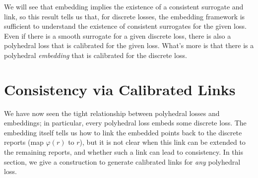 \documentclass[11pt]{article}
\newcommand{\Comments}{1}
\newcommand{\mynote}[2]{\ifnum\Comments=1\textcolor{#1}{#2}\fi}
\newcommand{\mytodo}[2]{\ifnum\Comments=1%
  \todo[linecolor=#1!80!black,backgroundcolor=#1,bordercolor=#1!80!black]{#2}\fi}
\newcommand{\raf}[1]{\mynote{darkgreen}{[RF: #1]}}
\newcommand{\jessiet}[1]{\mytodo{teal!20!white}{JF: #1}}
\newcommand{\btw}[1]{\mytodo{gray!20!white}{BTW: #1}}%
\newtheorem{corollary}{Corollary}
\begin{document}
We will see that embedding implies the existence of a consistent surrogate and link, so this result tells us that, for discrete losses, the embedding framework is sufficient to understand the existence of consistent surrogates for the given loss.
Even if there is a smooth surrogate for a given discrete loss, there is also a polyhedral loss that is calibrated for the given loss.
What's more is that there is a polyhedral \emph{embedding} that is calibrated for the discrete loss.




\section{Consistency via Calibrated Links}
\label{sec:calibration}

We have now seen the tight relationship between polyhedral losses and embeddings; in particular, every polyhedral loss embeds some discrete loss.
The embedding itself tells us how to link the embedded points back to the discrete reports (map $\varphi(r)$ to $r$), but it is not clear when this link can be extended to the remaining reports, and whether such a link can lead to consistency.
In this section, we give a construction to generate calibrated links for \emph{any} polyhedral loss.
\end{document}
